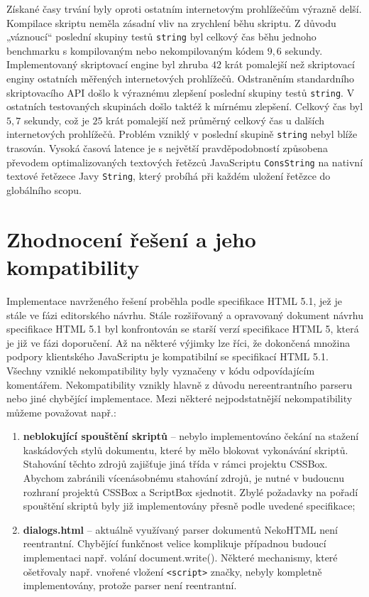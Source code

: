 Získané časy trvání byly oproti ostatním internetovým prohlížečům výrazně delší. Kompilace skriptu neměla zásadní vliv na zrychlení běhu skriptu. Z důvodu „váznoucí“ poslední skupiny testů \texttt{string} byl celkový čas běhu jednoho benchmarku s kompilovaným nebo nekompilovaným kódem $9,6$ sekundy. Implementovaný skriptovací engine byl zhruba $42$ krát pomalejší než skriptovací enginy ostatních měřených internetových prohlížečů. Odstraněním standardního skriptovacího API došlo k výraznému zlepšení poslední skupiny testů \texttt{string}. V ostatních testovaných skupinách došlo taktéž k mírnému zlepšení. Celkový čas byl $5,7$ sekundy, což je $25$ krát pomalejší než průměrný celkový čas u dalších internetových prohlížečů. Problém vzniklý v poslední skupině \texttt{string} nebyl blíže trasován. Vysoká časová latence je s největší pravděpodobností způsobena převodem optimalizovaných textových řetězců JavaScriptu \texttt{ConsString} na nativní textové řetězece Javy \texttt{String}, který probíhá při každém uložení řetězce do globálního scopu.

\section{Zhodnocení řešení a jeho kompatibility}
\label{Chapter.RevaluationAndCompatibility}

Implementace navrženého řešení proběhla podle specifikace HTML 5.1, jež je stále ve fázi editorského návrhu. Stále rozšiřovaný a opravovaný dokument návrhu specifikace HTML 5.1 byl konfrontován se starší verzí specifikace HTML 5, která je již ve fázi doporučení. Až na některé výjimky lze říci, že dokončená množina podpory klientského JavaScriptu je kompatibilní se specifikací HTML 5.1. Všechny vzniklé nekompatibility byly vyznačeny v kódu odpovídajícím komentářem. Nekompatibility vznikly hlavně z důvodu nereentrantního parseru nebo jiné chybějící implementace. Mezi některé nejpodstatnější nekompatibility můžeme považovat např.:

\begin{enumerate}
  \item \textbf{neblokující spouštění skriptů} -- nebylo implementováno čekání na stažení kaskádových stylů dokumentu, které by mělo blokovat vykonávání skriptů. Stahování těchto zdrojů zajišťuje jiná třída v rámci projektu CSSBox. Abychom zabránili vícenásobnému stahování zdrojů, je nutné v budoucnu rozhraní projektů CSSBox a ScriptBox sjednotit. Zbylé požadavky na pořadí spouštění skriptů byly již implementovány přesně podle uvedené specifikace;
  \item \textbf{dialogs.html} -- aktuálně využívaný parser dokumentů NekoHTML není reentrantní. Chybějící funkčnost velice komplikuje případnou budoucí implementaci např. volání document.write(). Některé mechanismy, které ošetřovaly např. vnořené vložení \texttt{<script>} značky, nebyly kompletně implementovány, protože parser není reentrantní.
\end{enumerate}

